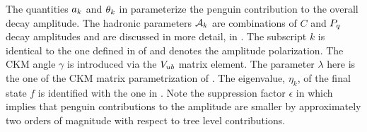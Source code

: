 \noindent The quantities $a_k$ and $\theta_k$ in  parameterize the penguin
contribution to the overall \BsJpsiPhi decay amplitude. The hadronic parameters $\mathcal{A}_{k}$ are combinations
of $C$ and $P_q$ decay amplitudes and are discussed in more detail, in .
The subscript $k$ is identical to the one defined in  of 
and denotes the \BsJpsiPhi amplitude polarization. The CKM angle $\gamma$ is introduced via the $V_{ub}$ matrix element.
The parameter $\lambda$ here is the one of the CKM matrix parametrization of .
The eigenvalue, $\eta_k$, of the final state $f$ is identified with the one in .
Note the suppression factor $\epsilon$ in  which implies that penguin contributions
to the \BsJpsiPhi amplitude are smaller by approximately two orders of magnitude with respect to tree level contributions.

